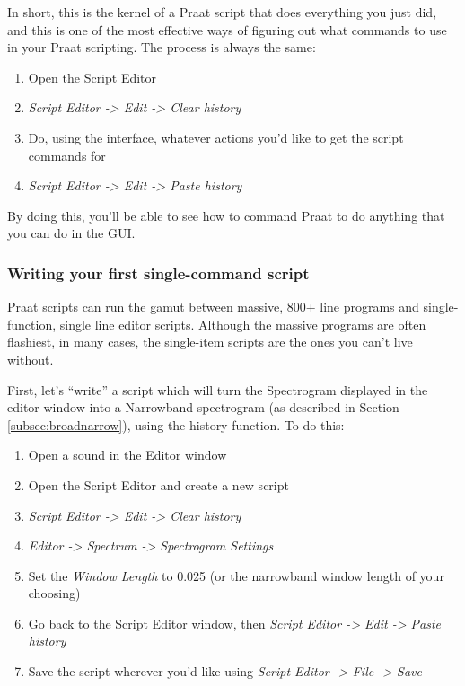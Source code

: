 In short, this is the kernel of a Praat script that does everything you
just did, and this is one of the most effective ways of figuring out
what commands to use in your Praat scripting. The process is always the
same:

\begin{enumerate}
\def\labelenumi{\arabic{enumi}.}
\tightlist
\item
  Open the Script Editor
\item
  \emph{Script Editor -\textgreater{} Edit -\textgreater{} Clear
  history}
\item
  Do, using the interface, whatever actions you'd like to get the script
  commands for
\item
  \emph{Script Editor -\textgreater{} Edit -\textgreater{} Paste
  history}
\end{enumerate}

By doing this, you'll be able to see how to command Praat to do anything
that you can do in the GUI.

\hypertarget{writing-your-first-single-command-script}{%
\subsubsection{Writing your first single-command
script}\label{writing-your-first-single-command-script}}

Praat scripts can run the gamut between massive, 800+ line programs and
single-function, single line editor scripts. Although the massive
programs are often flashiest, in many cases, the single-item scripts are
the ones you can't live without.

First, let's ``write'' a script which will turn the Spectrogram
displayed in the editor window into a Narrowband spectrogram (as
described in Section \ref{subsec:broadnarrow}), using the history
function. To do this:

\begin{enumerate}
\def\labelenumi{\arabic{enumi}.}
\tightlist
\item
  Open a sound in the Editor window
\item
  Open the Script Editor and create a new script
\item
  \emph{Script Editor -\textgreater{} Edit -\textgreater{} Clear
  history}
\item
  \emph{Editor -\textgreater{} Spectrum -\textgreater{} Spectrogram
  Settings}
\item
  Set the \emph{Window Length} to 0.025 (or the narrowband window length
  of your choosing)
\item
  Go back to the Script Editor window, then \emph{Script Editor
  -\textgreater{} Edit -\textgreater{} Paste history}
\item
  Save the script wherever you'd like using \emph{Script Editor
  -\textgreater{} File -\textgreater{} Save}
\end{enumerate}


